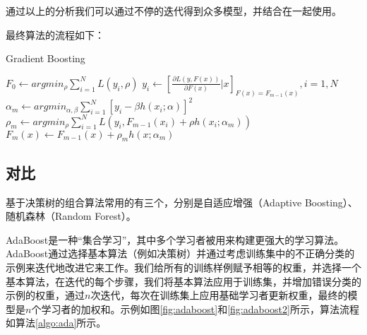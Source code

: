 通过以上的分析我们可以通过不停的迭代得到众多模型，并结合在一起使用。

最终算法的流程如下：

\begin{algorithm}
    \caption{Gradient Boosting}
    \label{algo:gb}
    \begin{algorithmic}[1]
    \State $F_{0} \gets argmin_{\rho}\sum_{i=1}^{N} L(y_{i},\rho)$
        \State $y_{i} \gets [\frac{\partial L(y,F(x))}{\partial F(x)} | x]_{F(x)=F_{m-1}(x)}, i=1,N$
        \State $\alpha_{m} \gets argmin_{\alpha,\beta}\sum_{i=1}^N[y_{i}-\beta h(x_{i};\alpha)]^2$
        \State $\rho_{m} \gets argmin_{\rho}\sum_{i=1}^N L(y_{i},F_{m-1}(x_{i}) + \rho h (x_{i};\alpha_{m}))$
        \State $F_{m}(x) \gets F_{m-1}(x)+\rho_{m} h(x;\alpha_{m})$
    \EndFor
    \end{algorithmic}
\end{algorithm}


\subsection{对比}

基于决策树的组合算法常用的有三个，分别是自适应增强（Adaptive Boosting）、随机森林（Random Forest）。

AdaBoost是一种“集合学习”，其中多个学习者被用来构建更强大的学习算法。 AdaBoost通过选择基本算法（例如决策树）并通过考虑训练集中的不正确分类的示例来迭代地改进它来工作。我们给所有的训练样例赋予相等的权重，并选择一个基本算法，在迭代的每个步骤，我们将基本算法应用于训练集，并增加错误分类的示例的权重，通过$n$次迭代，每次在训练集上应用基础学习者更新权重，最终的模型是$n$个学习者的加权和。示例如图\ref{fig:adaboost}和\ref{fig:adaboost2}所示，算法流程如算法\ref{algo:ada}所示。

